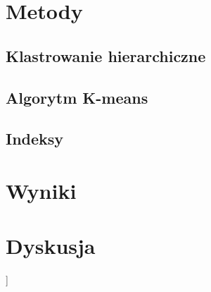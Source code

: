 \documentclass{article}
\begin{document}
\section{Metody}
\subsection{Klastrowanie hierarchiczne}
\subsection{Algorytm K-means}
\subsection{Indeksy}
\section{Wyniki}
\section{Dyskusja}]
\end{document}
